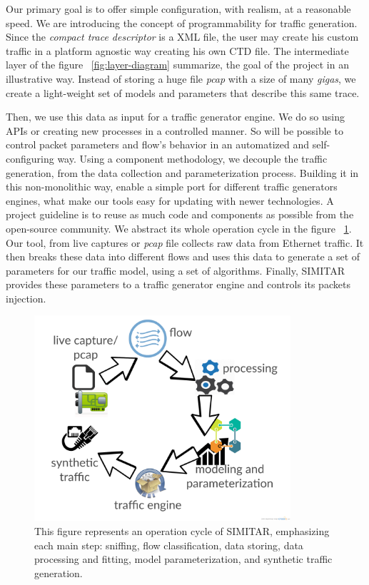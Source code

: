 Our primary goal is to offer simple configuration, with realism, at a reasonable speed. We are introducing the concept of programmability for traffic generation. Since the \textit{compact trace descriptor} is a XML file, the user may create his custom traffic in a platform agnostic way creating his own CTD file. The intermediate layer of the figure ~\ref{fig:layer-diagram} summarize, the goal of the project in an illustrative way. Instead of storing a huge file \textit{pcap} with a size of many \textit{gigas}, we create a light-weight set of models and parameters that describe this same trace. 


Then, we use this data as input for a traffic generator engine. We do so using APIs or creating new processes in a controlled manner. So will be possible to control packet parameters and flow's behavior in an automatized and self-configuring way. Using a component methodology, we decouple the traffic generation, from the data collection and parameterization process. Building it in this non-monolithic way,  enable a simple port for different traffic generators engines, what make our tools easy for updating with newer technologies. A project guideline is to reuse as much code and components as possible from the open-source community. We abstract its whole operation cycle in the figure ~\ref{fig:cycle-of-operation}. Our tool, from live captures or \textit{pcap} file collects raw data from Ethernet traffic. It then breaks these data into different flows and uses this data to generate a set of parameters for our traffic model, using a set of algorithms. Finally, SIMITAR provides these parameters to a traffic generator engine and controls its packets injection.

\begin{figure}[ht!]
        \centering
        \includegraphics[height=3.0in]{figures/ch3/digram-project-cycle}
        \caption{This figure represents an operation cycle of SIMITAR, emphasizing each main step: sniffing, flow classification, data storing, data processing and fitting, model parameterization,  and synthetic traffic generation.}
    \label{fig:cycle-of-operation}
\end{figure}


